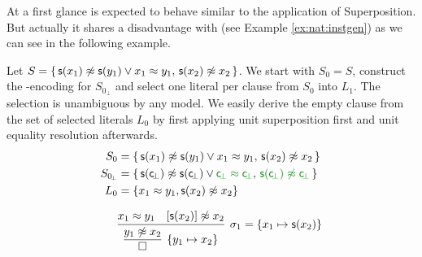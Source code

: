 At a first glance \InstGenEQ is expected to behave similar to the application of Superposition. 
But actually it shares a disadvantage with \InstGen (see Example \ref{ex:nat:instgen}) as we can see in the following example.


\begin{example}\label{ex:nat:instgeneq}
	Let $S = \{\, {\mathsf s}(x_1) \not\approx {\mathsf s} (y_1) \lor x_1 \approx y_1, \, {\mathsf s}(x_2)\not\approx x_2 \, \}$. 
	We start with $S_0 = S$, construct the \SMT-encoding for $S_{0\!_\bot}$
	and select one literal per clause from $S_0$ into $L_1$. 
	The selection is unambiguous by any model.
	We easily derive the empty clause from the set of selected literals $L_0$ 
	by first applying unit superposition first and unit equality resolution afterwards.
\begin{align*}
	S_0 &= \{\, {\msucc(x_1) \mNE \msucc (y_1) \lor x_1 \mEQ y_1}, \, \msucc(x_2)\mNE x_2 \, \} 
	\\
	S_{0\!_\bot} &= \{\, \msucc(\consbot) \mNE \msucc (\consbot) \lor{\colHi\consbot \mEQ \consbot}, \, 
	{\colHi \msucc(\consbot)\mNE \consbot} \, \}
	\\
	L_0 &= \{ x_1\mEQ y_1, \msucc(x_2)\mNE x_2  \}
	\\[0.7em]
	&\infer[\sigma_1 = \{ x_1\mapsto \msucc(x_2)\}
	]{ 
		\infer[\{y_1\mapsto x_2\}]{\emptyclause}{ {y_1}\mNE x_2 }
	}
	{x_1 \mEQ y_1 & [{\msucc(x_2)}]\mNE x_2}
	\\[0.7em]
\end{align*}


\end{example}
